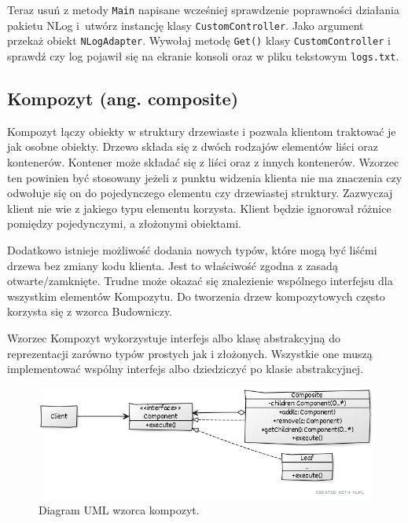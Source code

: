 Teraz usuń z metody \texttt{Main} napisane wcześniej sprawdzenie poprawności działania pakietu NLog i~utwórz instancję klasy \texttt{CustomController}. Jako argument przekaż obiekt \texttt{NLogAdapter}. Wywołaj metodę \texttt{Get()} klasy \texttt{CustomController} i sprawdź czy log pojawił się na ekranie konsoli oraz w pliku tekstowym \texttt{logs.txt}.


\subsection{Kompozyt (ang. composite)}

Kompozyt łączy obiekty w struktury drzewiaste i pozwala klientom traktować je jak osobne obiekty. Drzewo składa się z dwóch rodzajów elementów liści oraz kontenerów. Kontener może składać się z liści oraz z innych kontenerów. Wzorzec ten powinien być stosowany jeżeli z punktu widzenia klienta nie ma znaczenia czy odwołuje się on do pojedynczego elementu czy drzewiastej struktury. Zazwyczaj klient nie wie z jakiego typu elementu korzysta. Klient będzie ignorował różnice pomiędzy pojedynczymi, a złożonymi obiektami.


Dodatkowo istnieje możliwość dodania nowych typów, które mogą być liśćmi drzewa bez zmiany kodu klienta. Jest to właściwość zgodna z zasadą otwarte/zamknięte. Trudne może okazać się znalezienie wspólnego interfejsu dla wszystkim elementów Kompozytu. Do tworzenia drzew kompozytowych często korzysta się z wzorca Budowniczy.

Wzorzec Kompozyt wykorzystuje interfejs albo klasę abstrakcyjną do reprezentacji zarówno typów prostych jak i złożonych. Wszystkie one muszą implementować wspólny interfejs albo dziedziczyć po klasie abstrakcyjnej.
 
\begin{figure}[hbt!]
	\centering
	\includegraphics[width=0.8\linewidth]{images/CompositeUml}
	\caption{Diagram UML wzorca kompozyt.}
	\label{lab3/fig/CompositeUml}
\end{figure}
%

